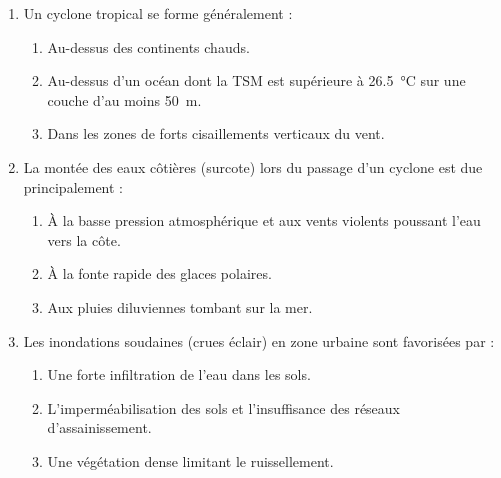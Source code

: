 \documentclass[11pt]{article}
\begin{document}
\begin{exercice}
\begin{enumerate}
    \item Un cyclone tropical se forme généralement :
    \begin{enumerate}
        \item Au-dessus des continents chauds.
        \item Au-dessus d'un océan dont la TSM est supérieure à \SI{26,5}{\celsius} sur une couche d'au moins \SI{50}{\meter}.
        \item Dans les zones de forts cisaillements verticaux du vent.
    \end{enumerate}
    \item La montée des eaux côtières (surcote) lors du passage d'un cyclone est due principalement :
    \begin{enumerate}
        \item À la basse pression atmosphérique et aux vents violents poussant l'eau vers la côte.
        \item À la fonte rapide des glaces polaires.
        \item Aux pluies diluviennes tombant sur la mer.
    \end{enumerate}
    \item Les inondations soudaines (crues éclair) en zone urbaine sont favorisées par :
    \begin{enumerate}
        \item Une forte infiltration de l'eau dans les sols.
        \item L'imperméabilisation des sols et l'insuffisance des réseaux d'assainissement.
        \item Une végétation dense limitant le ruissellement.
    \end{enumerate}
\end{enumerate}
\end{exercice}
\end{document}

